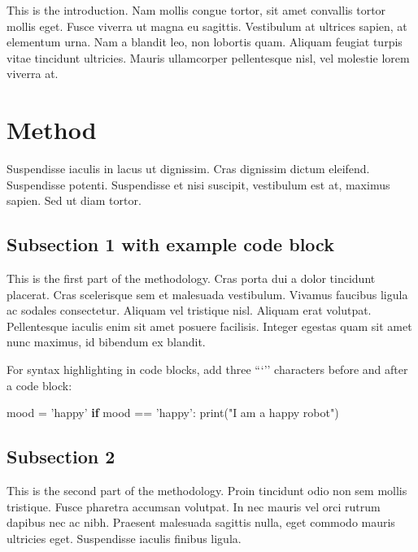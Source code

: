 \documentclass[12pt,a4paperpaper,]{report}
\newenvironment{Shaded}{}{}
\newcommand{\StringTok}[1]{\textcolor[rgb]{0.25,0.44,0.63}{{#1}}}
\newcommand{\ControlFlowTok}[1]{\textcolor[rgb]{0.00,0.44,0.13}{\textbf{{#1}}}}
\newcommand{\OperatorTok}[1]{\textcolor[rgb]{0.40,0.40,0.40}{{#1}}}
\newcommand{\BuiltInTok}[1]{{#1}}
\newcommand{\NormalTok}[1]{{#1}}
\begin{document}
This is the introduction. Nam mollis congue tortor, sit amet convallis
tortor mollis eget. Fusce viverra ut magna eu sagittis. Vestibulum at
ultrices sapien, at elementum urna. Nam a blandit leo, non lobortis
quam. Aliquam feugiat turpis vitae tincidunt ultricies. Mauris
ullamcorper pellentesque nisl, vel molestie lorem viverra at.

\section{Method}\label{method}

Suspendisse iaculis in lacus ut dignissim. Cras dignissim dictum
eleifend. Suspendisse potenti. Suspendisse et nisi suscipit, vestibulum
est at, maximus sapien. Sed ut diam tortor.

\subsection{Subsection 1 with example code
block}\label{subsection-1-with-example-code-block}

This is the first part of the methodology. Cras porta dui a dolor
tincidunt placerat. Cras scelerisque sem et malesuada vestibulum.
Vivamus faucibus ligula ac sodales consectetur. Aliquam vel tristique
nisl. Aliquam erat volutpat. Pellentesque iaculis enim sit amet posuere
facilisis. Integer egestas quam sit amet nunc maximus, id bibendum ex
blandit.

For syntax highlighting in code blocks, add three ```'' characters
before and after a code block:

\begin{Shaded}
\begin{Highlighting}[]
\NormalTok{mood }\OperatorTok{=} \StringTok{'happy'}
\ControlFlowTok{if} \NormalTok{mood }\OperatorTok{==} \StringTok{'happy'}\NormalTok{:}
    \BuiltInTok{print}\NormalTok{(}\StringTok{"I am a happy robot"}\NormalTok{)}
\end{Highlighting}
\end{Shaded}

\subsection{Subsection 2}\label{subsection-2}

This is the second part of the methodology. Proin tincidunt odio non sem
mollis tristique. Fusce pharetra accumsan volutpat. In nec mauris vel
orci rutrum dapibus nec ac nibh. Praesent malesuada sagittis nulla, eget
commodo mauris ultricies eget. Suspendisse iaculis finibus ligula.
\end{document}
